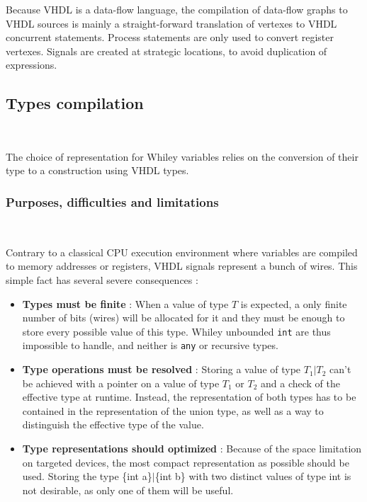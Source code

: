 \documentclass[10pt,a4paper]{article}
\newcommand{\code}{\texttt}
\renewcommand{\indent}{~\\\vspace{-.8cm}}
\begin{document}
Because VHDL is a data-flow language, the compilation of data-flow graphs to VHDL sources is mainly a straight-forward translation of vertexes to VHDL concurrent statements. Process statements are only used to convert register vertexes. Signals are created at strategic locations, to avoid duplication of expressions.



\subsection{Types compilation}\indent
\label{Types}

The choice of representation for Whiley variables relies on the conversion of their type to a construction using VHDL types.

\subsubsection{Purposes, difficulties and limitations}
\indent


Contrary to a classical CPU execution environment where variables are compiled to memory addresses or registers, VHDL signals represent a bunch of wires. This simple fact has several severe consequences :

\begin{itemize}
	\item \textbf{Types must be finite} : When a value of type $T$ is expected, a only finite number of bits (wires) will be allocated for it and they must be enough to store every possible value of this type. Whiley unbounded \code {int} are thus impossible to handle, and neither is \code {any} or recursive types.
	
	\item \textbf{Type operations must be resolved} : Storing a value of type $T_1|T_2$ can't be achieved with a pointer on a value of type $T_1$ or $T_2$ and a check of the effective type at runtime. Instead, the representation of both types has to be contained in the representation of the union type, as well as a way to distinguish the effective type of the value.
	
	\item \textbf{Type representations should optimized} : Because of the space limitation on targeted devices, the most compact representation as possible should be used. Storing the type \{int a\}$|$\{int b\} with two distinct values of type int is not desirable, as only one of them will be useful.
\end{itemize}
\end{document}
